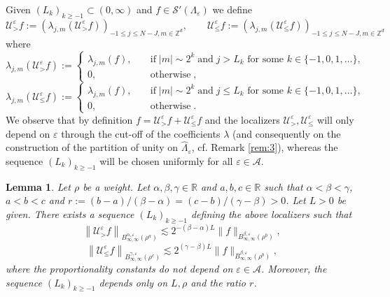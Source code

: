 \documentclass[a4paper,11pt]{article}
\newcommand{\assign}{:=}
\newcommand{\tmop}[1]{\ensuremath{\operatorname{#1}}}
\newtheorem{lemma}[theorem]{Lemma}
\numberwithin{equation}{section}
\newcommand{\UU}{\mathscr{U}}
\begin{document}
Given $(L_k)_{k \geqslant - 1} \subset (0, \infty)$ and $f \in \mathcal{S}'
(\Lambda_{\varepsilon})$ we define
\[ \UU_{>}^{\varepsilon} f \assign \left( \lambda_{j, m} \left(
   \UU^{\varepsilon}_{>} f \right) \right)_{- 1 \leqslant j \leqslant N - J, m
   \in \mathbb{Z}^d}, \qquad \UU_{\leqslant}^{\varepsilon} f \assign \left(
   \lambda_{j, m} \left( \UU_{\leqslant}^{\varepsilon} f \right) \right)_{- 1
   \leqslant j \leqslant N - J, m \in \mathbb{Z}^d} \]
where
\[ \lambda_{j, m} \left( \UU_{>}^{\varepsilon} f \right) \assign \left\{
   \begin{array}{lll}
     \lambda_{j, m} (f), &  & \tmop{if} | m | \sim 2^k \tmop{and} j > L_k \text{ for some } k\in \{-1,0,1,\dots\},\\
     0, &  & \tmop{otherwise},
   \end{array} \right. \]
\[ \lambda_{j, m} \left( \UU_{\leqslant}^{\varepsilon} f \right) \assign
   \left\{ \begin{array}{lll}
     \lambda_{j, m} (f), &  & \tmop{if} | m | \sim 2^k \tmop{and} j \leqslant
     L_k \text{ for some } k\in \{-1,0,1,\dots\},\\
     0, &  & \tmop{otherwise} .
   \end{array} \right. \]
We observe that by definition $f = \UU_{>}^{\varepsilon} f +
\UU_{\leqslant}^{\varepsilon} f$ and the localizers $\UU_{>}^{\varepsilon},
\UU_{\leqslant}^{\varepsilon}$ will only depend on $\varepsilon$ through the
cut-off of the coefficients $\lambda$ (and consequently on the construction of
the partition of unity on $\hat{\Lambda}_{\varepsilon}$, cf. Remark
\ref{rem:3}), whereas the sequence $(L_k)_{k \geqslant - 1}$ will be chosen
uniformly for all $\varepsilon \in \mathcal{A}$.

\begin{lemma}
  \label{lem:loc}Let $\rho$ be a weight. Let $\alpha, \beta, \gamma \in
  \mathbb{R}$ and $a, b, c \in \mathbb{R}$ such that $\alpha < \beta <
  \gamma$, $a < b < c$ and $r \assign (b - a) / (\beta - \alpha) = (c - b) /
  (\gamma - \beta) > 0$. Let $L > 0$ be given. There exists a sequence
  $(L_k)_{k \geqslant - 1}$ defining the above localizers such that
  \[ \left\| \UU^{\varepsilon}_{>} f \right\|_{B^{\alpha,
     \varepsilon}_{\infty, \infty} (\rho^a)} \lesssim 2^{- (\beta - \alpha) L}
     \| f \|_{B^{\beta, \varepsilon}_{\infty, \infty} (\rho^b)}, \]
  \[ \left\| \UU^{\varepsilon}_{\leqslant} f \right\|_{B^{\gamma,
     \varepsilon}_{\infty, \infty} (\rho^c)} \lesssim 2^{(\gamma - \beta) L}
     \| f \|_{B^{\beta, \varepsilon}_{\infty, \infty} (\rho^b)}, \]
  where the proportionality constants do not depend on $\varepsilon \in
  \mathcal{A}$. Moreover, the sequence $(L_k)_{k \geqslant - 1}$ depends only
  on $L, \rho$ and the ratio $r$.
\end{lemma}
\end{document}
